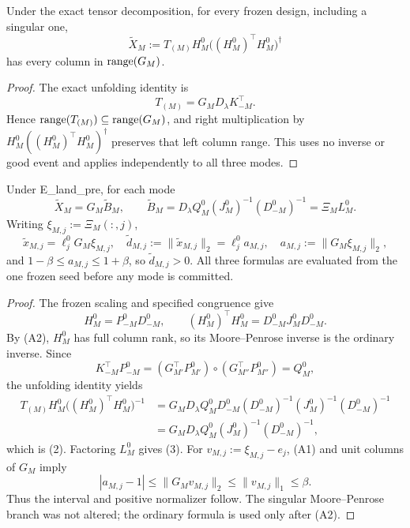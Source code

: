 \begin{lemma}\label{lem:step-010-range}
Under the exact tensor decomposition, for every frozen
design, including a singular one,
\[
\widetilde X_M:=T_{(M)}H_M^0\big((H_M^0)^\top H_M^0\big)^\dagger
\]
has every column in \({\rm range}(G_M)\).

\begin{proof}
The exact unfolding identity is
\[
T_{(M)}=G_MD_\lambda K_{-M}^{\top}. \tag{1}
\]
Hence \({\rm range}(T_{(M)})\subseteq{\rm range}(G_M)\), and right
multiplication by \(H_M^0((H_M^0)^\top H_M^0)^\dagger\) preserves that
left column range.  This uses no inverse or good event and applies
independently to all three modes.


\end{proof}
\end{lemma}
\begin{proposition}\label{prop:step-010-frozen-solves}
Under E\_land\_pre, for each mode
\[
\widetilde X_M=G_M\widetilde B_M,\qquad
\widetilde B_M=D_\lambda Q_M^0(J_M^0)^{-1}(D_{-M}^0)^{-1}
=\Xi_ML_M^0. \tag{2}
\]
Writing \(\xi_{M,j}:=\Xi_M(:,j)\),
\[
\widetilde x_{M,j}=\ell_j^0G_M\xi_{M,j},\quad
\widetilde d_{M,j}:=\|\widetilde x_{M,j}\|_2
=\ell_j^0a_{M,j},\quad a_{M,j}:=\|G_M\xi_{M,j}\|_2, \tag{3}
\]
and \(1-\beta\le a_{M,j}\le1+\beta\), so
\(\widetilde d_{M,j}>0\).  All three formulas are evaluated from the one
frozen seed before any mode is committed.

\begin{proof}
The frozen scaling and specified congruence give
\[
H_M^0=P_{-M}^0D_{-M}^0,\qquad
(H_M^0)^\top H_M^0=D_{-M}^0J_M^0D_{-M}^0. \tag{4}
\]
By (A2), \(H_M^0\) has full column rank, so its Moore--Penrose inverse is
the ordinary inverse.  Since
\[
K_{-M}^{\top}P_{-M}^0
=(G_{M'}^\top P_{M'}^0)\circ(G_{M''}^\top P_{M''}^0)
=Q_M^0,
\]
the unfolding identity yields
\[
\begin{aligned}
T_{(M)}H_M^0\big((H_M^0)^\top H_M^0\big)^{-1}
&=G_MD_\lambda Q_M^0D_{-M}^0
 (D_{-M}^0)^{-1}(J_M^0)^{-1}(D_{-M}^0)^{-1}\\
&=G_MD_\lambda Q_M^0(J_M^0)^{-1}(D_{-M}^0)^{-1},
\end{aligned}
\]
which is (2).  Factoring \(L_M^0\) gives (3).  For
\(v_{M,j}:=\xi_{M,j}-e_j\), (A1) and unit columns of \(G_M\) imply
\[
|a_{M,j}-1|\le\|G_Mv_{M,j}\|_2\le\|v_{M,j}\|_1\le\beta. \tag{5}
\]
Thus the interval and positive normalizer follow.  The singular
Moore--Penrose branch was not altered; the ordinary formula is used only
after (A2).


\end{proof}
\end{proposition}
